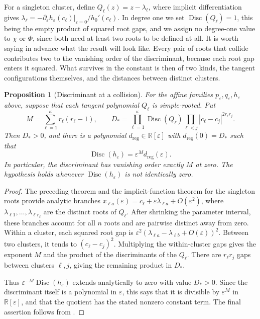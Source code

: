 \documentclass[12pt,reqno]{amsart}
\newtheorem{proposition}[proposition]{Proposition}
\theoremstyle{definition}
\theoremstyle{remark}
\newcommand{\R}{\mathbb R}
\newcommand{\eps}{\varepsilon}
\begin{document}
For a singleton cluster, define \(Q_\ell(z)=z-\lambda_\ell\),
where implicit differentiation gives
\(\lambda_\ell=-\left.\partial_\eps h_\eps(c_\ell)\right|_{\eps=0}/
h_0'(c_\ell)\). In degree one we set \(\operatorname{Disc}(Q_\ell)=1\),
this being the empty product of squared root gaps, and we assign no
degree-one value to \(\chi\) or \(\Phi\), since both need at least two
roots to be defined at all. 
It is worth saying in advance what the result will look like. Every pair of roots that collide contributes two to the vanishing order of the
discriminant, because each root gap enters it squared.  What survives in
the constant is then of two kinds, the tangent configurations themselves,
and the distances between distinct clusters.

\begin{proposition}[Discriminant at a collision]
\label{prop:collision-discriminant}
For the affine families \(p_\eps,q_\eps,h_\eps\) above, suppose
that each tangent polynomial \(Q_\ell\) is simple-rooted.  Put
\begin{equation}\label{eq:collision-discriminant-data}
 M=\sum_{\ell=1}^{\kappa} r_\ell(r_\ell-1),
 \qquad
 D_*=
 \prod_{\ell=1}^{\kappa}\operatorname{Disc}(Q_\ell)
 \prod_{\ell<j}|c_\ell-c_j|^{2r_\ell r_j}.
\end{equation}
Then \(D_*>0\), and there is a polynomial \(d_{\mathrm{reg}}\in\R[\eps]\)
with \(d_{\mathrm{reg}}(0)=D_*\) such that
\begin{equation}\label{eq:collision-discriminant-factorization}
 \operatorname{Disc}(h_\eps)=\eps^M d_{\mathrm{reg}}(\eps).
\end{equation}
In particular, the discriminant has vanishing order exactly \(M\) at
zero.  The hypothesis holds whenever
\(\operatorname{Disc}(h_\eps)\) is not identically zero.
\end{proposition}

\begin{proof}
The preceding theorem and the implicit-function theorem for the
singleton roots provide analytic branches
\(x_{\ell a}(\eps)=c_\ell+\eps\lambda_{\ell a}+O(\eps^2)\),
where \(\lambda_{\ell1},\ldots,\lambda_{\ell r_\ell}\) are
the distinct roots of \(Q_\ell\).  After shrinking the parameter
interval, these branches account for all \(n\) roots and are pairwise
distinct away from zero.  Within a cluster, each squared root gap is
\(\eps^2(\lambda_{\ell a}-\lambda_{\ell b}+O(\eps))^2\).
Between two clusters, it tends to \((c_\ell-c_j)^2\).  Multiplying
the within-cluster gaps gives the exponent \(M\) and the product of
the discriminants of the \(Q_\ell\).  There are \(r_\ell r_j\)
gaps between clusters \(\ell,j\), giving the remaining product in
\(D_*\).

Thus \(\eps^{-M}\operatorname{Disc}(h_\eps)\) extends analytically
to zero with value \(D_*>0\).  Since the discriminant itself is a
polynomial in \(\eps\), this says that it is divisible by
\(\eps^M\) in \(\R[\eps]\), and that the quotient has the
stated nonzero constant term.  The final assertion follows from
.
\end{proof}
\end{document}
